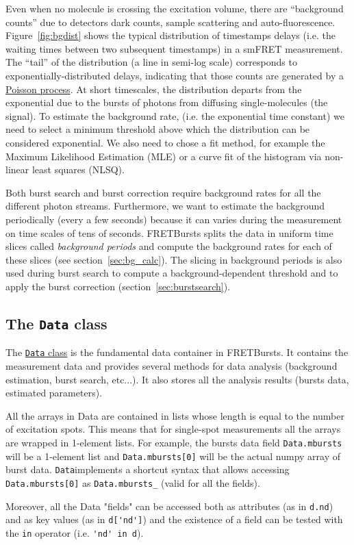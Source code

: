 Even when no molecule is crossing the excitation volume, there are “background counts” due to detectors dark counts, sample scattering and auto-fluorescence. Figure~\ref{fig:bgdist} shows the typical distribution of timestamps delays (i.e. the waiting times between two subsequent timestamps) in a smFRET measurement. The “tail” of the distribution (a line in semi-log scale) corresponds to exponentially-distributed delays, indicating that those counts are generated by a \href{http://en.wikipedia.org/wiki/Poisson_process}{Poisson process}. At short timescales, the distribution departs from the exponential due to the bursts of photons from diffusing single-molecules (the signal). To estimate the background rate, (i.e. the exponential time constant) we need to select a minimum threshold above which the distribution can be considered exponential. We also need to chose a fit method, for example the Maximum Likelihood Estimation (MLE) or a curve fit of the histogram via non-linear least squares (NLSQ).

Both burst search and burst correction require background rates for all the different photon streams. Furthermore, we want to estimate the background periodically (every a few seconds) because it can varies during the measurement on time scales of tens of seconds. FRETBursts splits the data in uniform time slices called \textit{background periods} and compute the background rates for each of these slices (see section~\ref{sec:bg_calc}). The slicing in background periods is also used during burst search to compute a background-dependent threshold and to apply the burst correction (section~\ref{sec:burstsearch}).

\subsection{The \texttt{Data} class}
\label{sec:data_intro}

The \href{http://fretbursts.readthedocs.org/en/latest/data_class.html}{\texttt{Data} class} is the fundamental data container in FRETBursts. It contains the measurement data and provides several methods for data analysis (background estimation, burst search, etc...). It also stores all the analysis results (bursts data, estimated parameters).

All the arrays in Data are contained in lists whose length is equal to the number of excitation spots. This means that for single-spot measurements all the arrays are wrapped in 1-element lists. For example, the bursts data field \verb|Data.mbursts| will be a 1-element list and \verb|Data.mbursts[0]| will be the actual numpy array of burst data. \verb|Data|implements a shortcut syntax that allows accessing 
\verb|Data.mbursts[0]| as \verb|Data.mbursts_| (valid for all the fields).

Moreover, all the Data "fields" can be accessed both as attributes (as in \verb|d.nd|) and as key values (as in \verb|d['nd']|) and the existence of a field can be tested with the \verb|in| operator (i.e. \verb|'nd' in d|).
